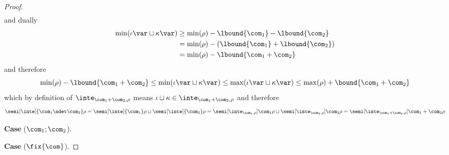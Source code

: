 \begin{proof}
\begin{align*}
  \end{align*}
  and dually
  \begin{align*}
    \min(\iota\var\sqcup\kappa\var) & \geq \min(\rho) - \lbound{\com_1} - \lbound{\com_2} \\
                                    & = \min(\rho) - (\lbound{\com_1} + \lbound{\com_2}) \\
                                    & = \min(\rho) - \lbound{\com_1 + \com_2}
  \end{align*}
  and therefore
  \begin{equation*}
    \min(\rho) - \lbound{\com_1 + \com_2} \leq \min(\iota\var \sqcup \kappa\var) \leq \max(\iota\var \sqcup \kappa\var) \leq \max(\rho) + \bound{\com_1 + \com_2}
  \end{equation*}
  which by definition of \(\inte_{\com_1 + \com_2, \rho}\) means
  \(\iota \sqcup \kappa \in \inte_{\com_1 + \com_2, \rho}\) and
  therefore
  \begin{equation*}
    \semi[\inte]{\com_1 \ndet \com_2}\rho = \semi[\inte]{\com_1}\rho \sqcup \semi[\inte]{\com_2}\rho = \semi[\inte_{\com_1, \rho}]{\com_1}\rho \sqcup \semi[\inte_{\com_2, \rho}]{\com_2}\rho = \semi[\inte_{\com_1 + \com_2, \rho}]{\com_1 + \com_2}\rho
  \end{equation*}
  
  
  \medskip

  \noindent
  \textbf{Case} (\(\com_1 ; \com_2\)).

  \medskip

  \noindent
  \textbf{Case} (\(\fix{\com}\)).
  

\end{proof}
